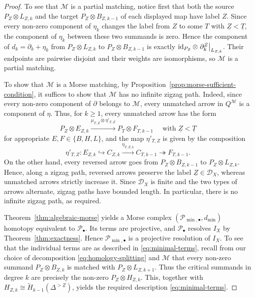 \documentclass[a4paper,leqno]{amsart}
\begin{document}
\begin{proof} 
To see that $\mathcal M$ is a partial matching, notice first that both the source $P_Z\otimes L_{Z,k}$ and the target $P_Z\otimes B_{Z,k-1}$ of each displayed map have label $Z$. Since every non-zero component of $\eta_k$ changes the label from $Z$ to some $T$ with $\underline{Z}<\underline{T}$, the component of $\eta_k$ between these two summands is zero. Hence the component of $d_k=\partial_k+\eta_k$ from $P_Z\otimes L_{Z,k}$ to $P_Z\otimes B_{Z,k-1}$ is exactly $\operatorname{id}_{P_Z}\otimes\left.\partial^Z_k\right|_{L_{Z,k}}$. Their endpoints are pairwise disjoint and their weights are isomorphisms, so $\mathcal M$ is a partial matching.

To show that $\mathcal M$ is a Morse matching, by Proposition~\ref{prop:morse-sufficient-condition}, it suffices to show that $\mathcal M$ has no infinite zigzag path.
Indeed, since every non-zero component of $\partial$ belongs to $\mathcal M$, every unmatched arrow in $Q^{\mathcal M}$ is a component of $\eta$. Thus, for $k\geq1$, every unmatched arrow has the form
\[
 P_Z\otimes E_{Z,k}
 \xrightarrow{\mu_{T,Z}\otimes\eta'_{T,Z}}
 P_T\otimes F_{T,k-1}
 \quad \text{ with }\underline{Z}<\underline{T}
\]
for appropriate $E,F\in\{B,H,L\}$, and the map $\eta'_{T,Z}$ is given by the composition
\begin{equation*}\label{eq:delta'}
 \eta'_{T,Z}:
 E_{Z,k}\hookrightarrow C_{Z,k}
 \xrightarrow{\eta_{T,Z,k}}C_{T,k-1}
 \twoheadrightarrow F_{T,k-1}.
\end{equation*}
On the other hand, every reversed arrow goes from $P_Z\otimes B_{Z,k-1}$ to $P_Z\otimes L_{Z,k}$. Hence, along a zigzag path, reversed arrows preserve the label $\underline{Z}\in\mathcal D_X$, whereas unmatched arrows strictly increase it. 
Since $\mathcal D_X$ is finite and the two types of arrows alternate, zigzag paths have bounded length. In particular, there is no infinite zigzag path, as required.

Theorem~\ref{thm:algebraic-morse} yields a Morse complex $(\mathcal P_{\min,\bullet},d_{\min})$ homotopy equivalent to $\mathcal P_\bullet$.
Its terms are projective, and $\mathcal P_\bullet$ resolves $I_X$ by Theorem~\ref{thm:exactness}.  Hence $\mathcal P_{\min,\bullet}$ is a projective resolution of $I_X$.  To see that the individual terms are as described in \eqref{eq:minimal-terms}, recall from our choice of decomposition \eqref{eq:homology-splitting} and $\mathcal{M}$ that every non-zero summand $P_Z\otimes B_{Z,k}$ is matched with $P_Z\otimes L_{Z,k+1}$.
Thus the critical summands in degree $k$ are precisely the non-zero $P_Z\otimes H_{Z,k}$. This, together with $H_{Z,k}\cong\widetilde H_{k-1}(\Delta^{>\underline{Z}})$, yields the required description \eqref{eq:minimal-terms}. 


\end{proof}
\end{document}
